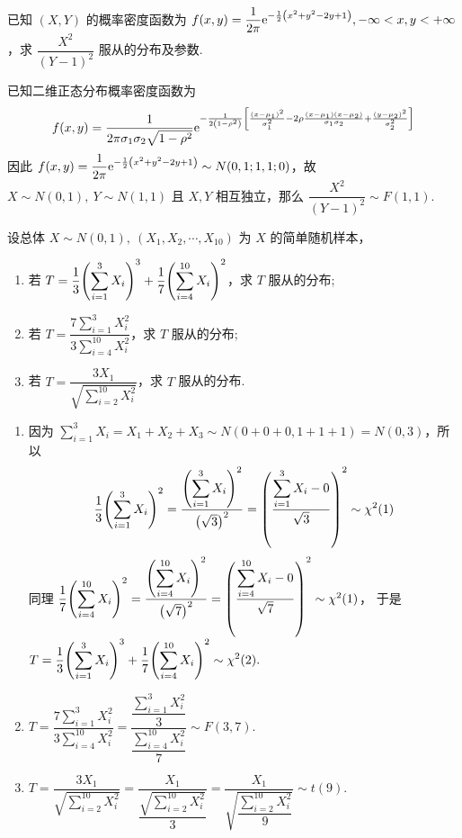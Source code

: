 \begin{example}
    已知 $(X,Y)$ 的概率密度函数为 $\displaystyle f(x,y)=\dfrac{1}{2\pi}\mathrm{e}^{-\frac{1}{2}\qty(x^2+y^2-2y+1)},-\infty<x,y<+\infty$，求 $\dfrac{X^2}{(Y-1)^2}$ 服从的分布及参数.
\end{example}
\begin{solution}
    已知二维正态分布概率密度函数为 $$f(x,y)=\dfrac{1}{2\pi\sigma_1\sigma_2\sqrt{1-\rho^2}}\mathrm{e}^{-\frac{1}{2\qty(1-\rho^2)}\qty[\frac{(x-\mu_1)^2}{\sigma_1^2}-2\rho\frac{(x-\mu_1)(x-\mu_2)}{\sigma_1\sigma_2}+\frac{(y-\mu_2)^2}{\sigma_2^2}]}$$
    因此 $f(x,y)=\dfrac{1}{2\pi}\mathrm{e}^{-\frac{1}{2}\qty(x^2+y^2-2y+1)}\sim N(0,1;1,1;0)$，故 $X\sim N(0,1),~Y\sim N(1,1)$ 且 $X,Y$ 相互独立，那么 $\dfrac{X^2}{(Y-1)^2}\sim F(1,1).$
\end{solution}

\begin{example}
    设总体 $X\sim N(0,1),~(X_1,X_2,\cdots,X_{10})$ 为 $X$ 的简单随机样本，
    \begin{enumerate}[label=(\arabic{*})]
        \item 若 $T=\displaystyle\dfrac{1}{3}\qty(\sum_{i=1}^{3}X_i)^3+\dfrac{1}{7}\qty(\sum_{i=4}^{10}X_i)^2$，求 $T$ 服从的分布;
        \item 若 $T=\dfrac{\displaystyle7\sum_{i=1}^{3}X_i^2}{\displaystyle 3\sum_{i=4}^{10}X_i^2}$，求 $T$ 服从的分布;
        \item 若 $T=\dfrac{3X_1}{\sqrt{\displaystyle\sum_{i=2}^{10}X_i^2}}$，求 $T$ 服从的分布.
    \end{enumerate}
\end{example}
\begin{solution}
    \begin{enumerate}[label=(\arabic{*})]
        \item 因为 $\displaystyle\sum_{i=1}^{3}X_i=X_1+X_2+X_3\sim N(0+0+0,1+1+1)=N(0,3)$，所以
              $$\dfrac{1}{3}\qty(\sum_{i=1}^{3}X_i)^2=\dfrac{\displaystyle\qty(\sum_{i=1}^{3}X_i)^2}{\qty(\sqrt{3})^2}=\qty(\dfrac{\displaystyle\sum_{i=1}^{3}X_i-0}{\sqrt{3}})^2\sim \chi^2(1)$$
              同理 $\dfrac{1}{7}\qty(\displaystyle\sum_{i=4}^{10}X_i)^2=\dfrac{\qty(\displaystyle\sum_{i=4}^{10}X_i)^2}{\qty(\sqrt{7})^2}=\qty(\dfrac{\displaystyle\sum_{i=4}^{10}X_i-0}{\sqrt{7}})^2\sim\chi^2(1)$，
              于是 $T=\displaystyle\dfrac{1}{3}\qty(\sum_{i=1}^{3}X_i)^3+\dfrac{1}{7}\qty(\sum_{i=4}^{10}X_i)^2\sim\chi^2(2).$
        \item $T=\dfrac{\displaystyle7\sum_{i=1}^{3}X_i^2}{\displaystyle 3\sum_{i=4}^{10}X_i^2}=\dfrac{\dfrac{\sum_{i=1}^{3}X_i^2}{3}}{\dfrac{\sum_{i=4}^{10}X_i^2}{7}}\sim F(3,7).$
        \item $T=\dfrac{3X_1}{\sqrt{\displaystyle\sum_{i=2}^{10}X_i^2}}=\dfrac{X_1}{\dfrac{\sqrt{\sum_{i=2}^{10}X_i^2}}{3}}=\dfrac{X_1}{\sqrt{\dfrac{\sum_{i=2}^{10}X_i^2}{9}}}\sim t(9).$
    \end{enumerate}
\end{solution}
